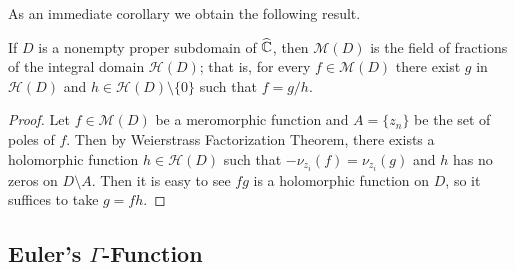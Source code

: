 As an immediate corollary we obtain the following result.
\begin{theorem}
If $D$ is a nonempty proper subdomain of $\widehat{\mathbb{C}}$, then $\mathcal{M}(D)$ is the field of fractions of the integral domain $\mathcal{H}(D)$; that is, for every $f\in\mathcal{M}(D)$ there exist $g$ in $\mathcal{H}(D)$ and $h\in\mathcal{H}(D)\setminus\{0\}$ such that $f=g/h$.
\end{theorem}
\begin{proof}
Let $f\in\mathcal{M}(D)$ be a meromorphic function and $A=\{z_n\}$ be the set of poles of $f$. Then by Weierstrass Factorization Theorem, there exists a holomorphic function $h\in\mathcal{H}(D)$ such that $-\nu_{z_i}(f)=\nu_{z_i}(g)$ and $h$ has no zeros on $D\setminus A$. Then it is easy to see $fg$ is a holomorphic function on $D$, so it suffices to take $g=fh$.
\end{proof}
\subsection{Euler's $\Gamma$-Function}
